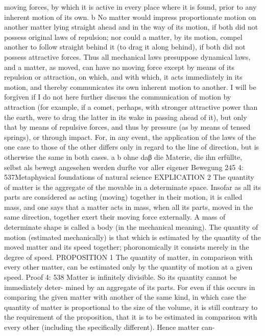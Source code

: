 moving forces, by which it is active in every place where it is found,
prior to any inherent motion of its own. b No matter would impress
proportionate motion on another matter lying straight ahead and in the
way of its motion, if both did not possess original laws of repulsion; nor
could a matter, by its motion, compel another to follow straight behind
it (to drag it along behind), if both did not possess attractive forces.
Thus all mechanical laws presuppose dynamical laws, and a matter, as
moved, can have no moving force except by means of its repulsion or
attraction, on which, and with which, it acts immediately in its motion,
and thereby communicates its own inherent motion to another. I will be
forgiven if I do not here further discuss the communication of motion
by attraction (for example, if a comet, perhaps, with stronger attractive
power than the earth, were to drag the latter in its wake in passing ahead
of it), but only that by means of repulsive forces, and thus by pressure
(as by means of tensed springs), or through impact. For, in any event,
the application of the laws of the one case to those of the other differs
only in regard to the line of direction, but is otherwise the same in both
cases.
a
b
ohne daβ die Materie, die ihn erfüllte, selbst als bewegt angesehen werden durfte
vor aller eigener Bewegung
245
4: 537Metaphysical foundations of natural science
EXPLICATION 2
The quantity of matter is the aggregate of the movable in a determinate
space. Insofar as all its parts are considered as acting (moving) together in
their motion, it is called mass, and one says that a matter acts in mass, when
all its parts, moved in the same direction, together exert their moving force
externally. A mass of determinate shape is called a body (in the mechanical
meaning). The quantity of motion (estimated mechanically) is that which
is estimated by the quantity of the moved matter and its speed together;
phoronomically it consists merely in the degree of speed.
PROPOSITION 1
The quantity of matter, in comparison with every other matter, can be
estimated only by the quantity of motion at a given speed.
Proof
4: 538
Matter is inﬁnitely divisible. So its quantity cannot be immediately deter-
mined by an aggregate of its parts. For even if this occurs in comparing the
given matter with another of the same kind, in which case the quantity of
matter is proportional to the size of the volume, it is still contrary to the
requirement of the proposition, that it is to be estimated in comparison
with every other (including the speciﬁcally different). Hence matter can-
